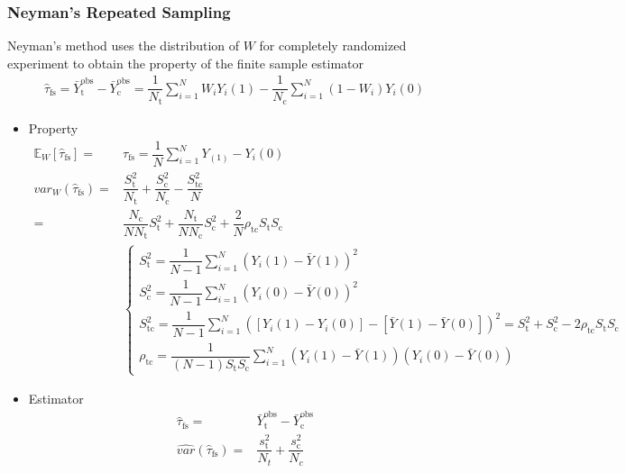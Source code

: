     
\subsubsection{Neyman's Repeated Sampling}

Neyman's method uses the distribution of $ W $ for completely randomized experiment to obtain the property of the finite sample estimator
\begin{align*}
    \hat{\tau}_\mathrm{fs}=\bar{Y}_\mathrm{t}^\mathrm{obs}-\bar{Y}_\mathrm{c}^\mathrm{obs}= \dfrac{1}{N_\mathrm{t} }\sum_{i=1}^N W_iY_i(1)-\dfrac{1}{N_\mathrm{c} } \sum_{i=1}^N(1-W_i)Y_i(0)   
\end{align*}

\begin{itemize}[topsep=2pt,itemsep=0pt]
    \item Property
    \begin{align*}
        \mathbb{E}_W\left[ \hat{\tau}_\mathrm{fs}  \right] = & \tau_\mathrm{fs}=\dfrac{1}{N}\sum_{i=1}^NY_(1)-Y_i(0) \\
        var_W(\hat{\tau}_\mathrm{fs} )=&\dfrac{S_\mathrm{t} ^2}{N_\mathrm{t} }+\dfrac{S_\mathrm{c} ^2}{N_\mathrm{c} }-\dfrac{S^2_{\mathrm{tc} }}{N}\\
        =&\dfrac{N_\mathrm{c} }{NN_\mathrm{t} }S_\mathrm{t} ^2+\dfrac{N_\mathrm{t} }{NN_\mathrm{c} }S_\mathrm{c}^2+\dfrac{2}{N}\rho _{\mathrm{tc} }S_\mathrm{t}S_\mathrm{c}    \\
        &\begin{cases}
            S_\mathrm{t}^2=\dfrac{1}{N-1}\sum_{i=1}^N(Y_i(1)-\bar{Y}(1))^2\\
            S_\mathrm{c}^2=\dfrac{1}{N-1}\sum_{i=1}^N(Y_i(0)-\bar{Y}(0))^2\\
            S_\mathrm{tc}^2=\dfrac{1}{N-1}\sum_{i=1}^N\left([Y_i(1)-Y_i(0)]-[\bar{Y}(1)-\bar{Y}(0)]\right)^2=S_\mathrm{t}^2+S_\mathrm{c}^2-2\rho _\mathrm{tc}S_\mathrm{t}S_{\mathrm{c} }    \\
            \rho _\mathrm{tc}=\dfrac{1}{(N-1)S_\mathrm{t}S_{\mathrm{c} } }\sum_{i=1}^N\left(Y_i(1)-\bar{Y}(1)\right)\left(Y_i(0)-\bar{Y}(0)\right) 
        \end{cases}
    \end{align*}
    \item Estimator
    \begin{align*}
        \hat{\tau}_\mathrm{fs}= & \bar{Y}_\mathrm{t}^\mathrm{obs}-\bar{Y}_\mathrm{c}^\mathrm{obs}\\
        \hat{var}(\hat{\tau}_\mathrm{fs} )=&\dfrac{s^2_\mathrm{t} }{N_t}+\dfrac{s^2_\mathrm{c} }{N_c}\\

\end{align*}
\end{itemize}
